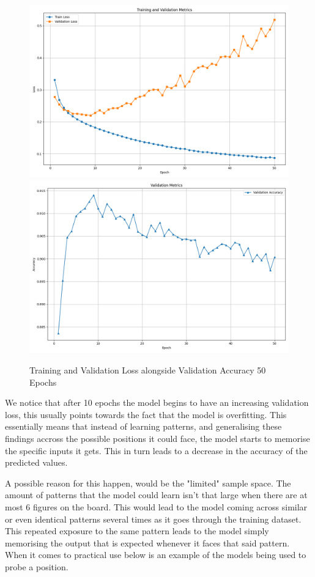 \begin{figure}[H]
    \centering
    \includegraphics[scale=0.35]{images/50EpochTrainValLoss.png}
    \includegraphics[scale=0.35]{images/50EpochValAcc.png}
    \caption{Training and Validation Loss alongside Validation Accuracy 50 Epochs}
    \label{fig: 50epoch Metrics}
\end{figure}

We notice that after 10 epochs the model begins to have an increasing validation loss, this usually points towards the fact that the model is overfitting. This essentially means that instead of learning patterns, and generalising these findings accross the possible positions it could face, the model starts to memorise the specific inputs it gets. This in turn leads to a decrease in the accuracy of the predicted values.

A possible reason for this happen, would be the "limited" sample space. The amount of patterns that the model could learn isn't that large when there are at most 6 figures on the board. This would lead to the model coming across similar or even identical patterns several times as it goes through the training dataset. This repeated exposure to the same pattern leads to the model simply memorising the output that is expected whenever it faces that said pattern.
\newpage
When it comes to practical use below is an example of the models being used to probe a position.

